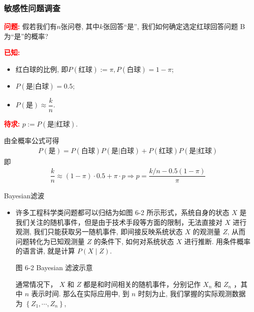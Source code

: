 \begin{frame}
	\frametitle{敏感性问题调查}
	{\bf \textcolor{red}{问题:}} 假若我们有$n$张问卷, 其中$k$张回答“是”, 我们如何确定选定红球回答问题 B 为“是”的概率?


	\pause
	{\bf \textcolor{red}{已知:}}
	\begin{itemize}[<+-|alert@+>]
		\item 红白球的比例, 即$P(\mbox{红球}):=\pi, P(\mbox{白球})=1-\pi$;
		\item $P(\mbox{是}|\mbox{白球})=0.5$;
		\item $P(\mbox{是})\approx \dfrac{k}{n}$.
	\end{itemize}
	\pause
	{\bf \textcolor{red}{待求:}} $p:=P(\mbox{是}|\mbox{红球})$.

	\pause
	{\bf\jieda} 由全概率公式可得
	\begin{eqnarray*}
		P(\mbox{是})=P(\mbox{白球})P(\mbox{是}|\mbox{白球})+P(\mbox{红球})P(\mbox{是}|\mbox{红球})
	\end{eqnarray*}
	即\pause
	\begin{eqnarray*}
		\dfrac{k}{n}\approx (1-\pi)\cdot 0.5+\pi\cdot p \Rightarrow p=\dfrac{k/n-0.5(1-\pi)}{\pi}
	\end{eqnarray*}


\end{frame}

\begin{frame}{{\rm Bayesian}滤波}
\begin{itemize}
	\item 许多工程科学类问题都可以归结为如图 6-2 所示形式，系统自身的状态 \( X \) 是我们关注的随机事件，但是由于技术手段等方面的限制，无法直接对 \( X \) 进行观测, 我们只能获取另一随机事件, 即间接反映系统状态 \( X \) 的观测量 \( Z \), 从而问题转化为已知观测量 \( Z \) 的条件下, 如何对系统状态 \( X \) 进行推断. 用条件概率的语言讲, 就是计算 \( P(X \mid Z) \).

	图 6-2 Bayesian 滤波示意

	通常情况下， \( X \) 和 \( Z \) 都是和时间相关的随机事件，分别记作 \( X_{n} \) 和 \( Z_{n} \) ，其中 \( n \) 表示时间. 那么在实际应用中, 到 \( n \) 时刻为止, 我们掌握的实际观测数据为 \( \left\{Z_{1}, \cdots, Z_{n}\right\} \),
\end{itemize}


\end{frame}




